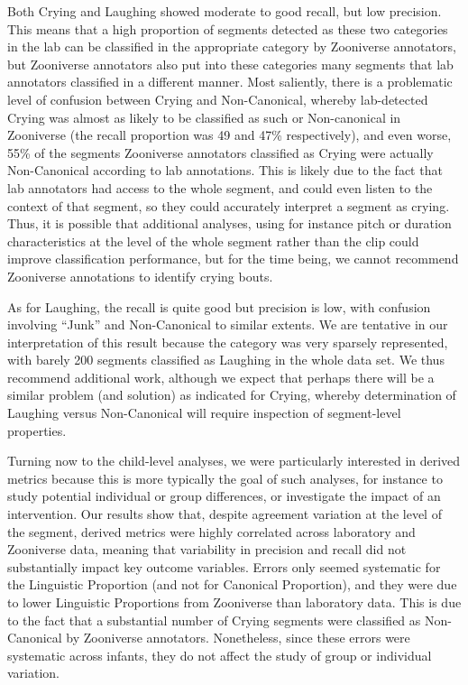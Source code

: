\documentclass[english,,man]{apa6}
\begin{document}
Both Crying and Laughing showed moderate to good recall, but low precision. This means that a high proportion of segments detected as these two categories in the lab can be classified in the appropriate category by Zooniverse annotators, but Zooniverse annotators also put into these categories many segments that lab annotators classified in a different manner. Most saliently, there is a problematic level of confusion between Crying and Non-Canonical, whereby lab-detected Crying was almost as likely to be classified as such or Non-canonical in Zooniverse (the recall proportion was 49 and 47\% respectively), and even worse, 55\% of the segments Zooniverse annotators classified as Crying were actually Non-Canonical according to lab annotations. This is likely due to the fact that lab annotators had access to the whole segment, and could even listen to the context of that segment, so they could accurately interpret a segment as crying. Thus, it is possible that additional analyses, using for instance pitch or duration characteristics at the level of the whole segment rather than the clip could improve classification performance, but for the time being, we cannot recommend Zooniverse annotations to identify crying bouts.

As for Laughing, the recall is quite good but precision is low, with confusion involving \enquote{Junk} and Non-Canonical to similar extents. We are tentative in our interpretation of this result because the category was very sparsely represented, with barely 200 segments classified as Laughing in the whole data set. We thus recommend additional work, although we expect that perhaps there will be a similar problem (and solution) as indicated for Crying, whereby determination of Laughing versus Non-Canonical will require inspection of segment-level properties.

Turning now to the child-level analyses, we were particularly interested in derived metrics because this is more typically the goal of such analyses, for instance to study potential individual or group differences, or investigate the impact of an intervention. Our results show that, despite agreement variation at the level of the segment, derived metrics were highly correlated across laboratory and Zooniverse data, meaning that variability in precision and recall did not substantially impact key outcome variables. Errors only seemed systematic for the Linguistic Proportion (and not for Canonical Proportion), and they were due to lower Linguistic Proportions from Zooniverse than laboratory data. This is due to the fact that a substantial number of Crying segments were classified as Non-Canonical by Zooniverse annotators. Nonetheless, since these errors were systematic across infants, they do not affect the study of group or individual variation.
\end{document}
